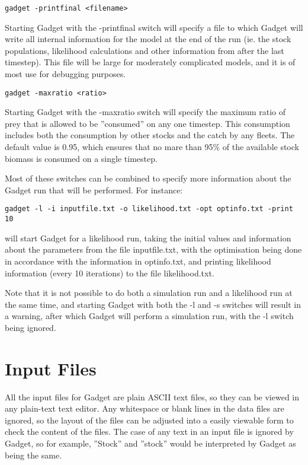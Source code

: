 \documentclass[10pt,twoside]{book}
\begin{document}
{\small\begin{verbatim}
gadget -printfinal <filename>
\end{verbatim}}
Starting Gadget with the -printfinal switch will specify a file to which Gadget will write all internal information for the model at the end of the run (ie. the stock populations, likelihood calculations and other information from after the last timestep).  This file will be large for moderately complicated models, and it is of most use for debugging purposes.

{\small\begin{verbatim}
gadget -maxratio <ratio>
\end{verbatim}}
Starting Gadget with the -maxratio switch will specify the maximum ratio of prey that is allowed to be ''consumed'' on any one timestep.  This consumption includes both the consumption by other stocks and the catch by any fleets.  The default value is 0.95, which ensures that no mare than 95\% of the available stock biomass is consumed on a single timestep.


\bigskip
Most of these switches can be combined to specify more information about the Gadget run that will be performed.  For instance:

{\small\begin{verbatim}
gadget -l -i inputfile.txt -o likelihood.txt -opt optinfo.txt -print 10
\end{verbatim}}

will start Gadget for a likelihood run, taking the initial values and information about the parameters from the file inputfile.txt, with the optimisation being done in accordance with the information in optinfo.txt, and printing likelihood information (every 10 iterations) to the file likelihood.txt.

\bigskip
Note that it is not possible to do both a simulation run and a likelihood run at the same time, and starting Gadget with both the -l and -s switches will result in a warning, after which Gadget will perform a simulation run, with the -l switch being ignored.

\chapter{Input Files}\label{chap:input}
All the input files for Gadget are plain ASCII text files, so they can be viewed in any plain-text text editor.  Any whitespace or blank lines in the data files are ignored, so the layout of the files can be adjusted into a easily viewable form to check the content of the files.  The case of any text in an input file is ignored by Gadget, so for example, ''Stock'' and ''stock'' would be interpreted by Gadget as being the same.
\end{document}
